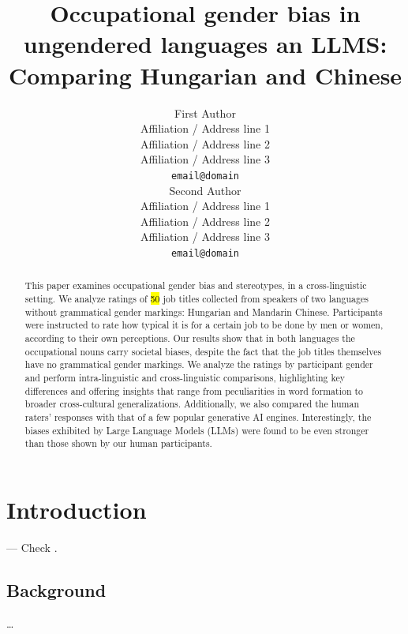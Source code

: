 \documentclass[11pt]{article}
\title{Occupational gender bias in ungendered languages an LLMS: Comparing Hungarian and Chinese}
\author{First Author \\
  Affiliation / Address line 1 \\
  Affiliation / Address line 2 \\
  Affiliation / Address line 3 \\
  \texttt{email@domain} \\\And
  Second Author \\
  Affiliation / Address line 1 \\
  Affiliation / Address line 2 \\
  Affiliation / Address line 3 \\
  \texttt{email@domain} \\}
\begin{document}
\maketitle

\begin{abstract}
This paper examines occupational gender bias and stereotypes, in a cross-linguistic setting. We analyze ratings of \hl{50} job titles collected from speakers of two languages without grammatical gender markings: Hungarian and Mandarin Chinese. Participants were instructed to rate how typical it is for a certain job to be done by men or women, according to their own perceptions. 
Our results show that in both languages the occupational nouns carry societal biases, despite the fact that the job titles themselves have no grammatical gender markings. We analyze the ratings by participant gender and perform intra-linguistic and cross-linguistic comparisons, highlighting key differences and offering insights that range from peculiarities in word formation to broader cross-cultural generalizations. 
Additionally, we also compared the human raters' responses with that of a few popular generative AI engines. Interestingly, the biases exhibited by Large Language Models (LLMs) were found to be even stronger than those shown by our human participants.

\end{abstract}

\section{Introduction}

--- Check \citet{kaukonen_2025_gender}.

\subsection{Background}

\dots

\end{document}
